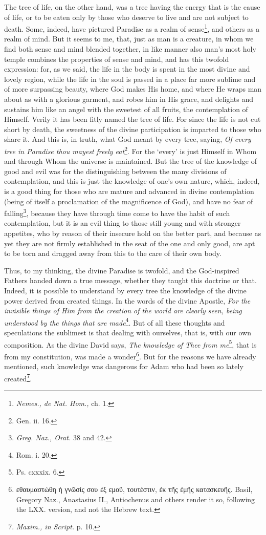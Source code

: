 The tree of life, on the other hand, was a tree having the energy that is the cause of life, or to be eaten only by those who deserve to live and are not subject to death. Some, indeed, have pictured Paradise as a realm of sense\footnote{\emph{Nemes., de Nat. Hom., }ch. 1.}, and others as a realm of mind. But it seems to me, that, just as man is a creature, in whom we find both sense and mind blended together, in like manner also man’s most holy temple combines the properties of sense and mind, and has this twofold expression: for, as we said, the life in the body is spent in the most divine and lovely region, while the life in the soul is passed in a place far more sublime and of more surpassing beauty, where God makes His home, and where He wraps man about as with a glorious garment, and robes him in His grace, and delights and sustains him like an angel with the sweetest of all fruits, the contemplation of Himself. Verily it has been fitly named the tree of life. For since the life is not cut short by death, the sweetness of the divine participation is imparted to those who share it. And this is, in truth, what God meant by every tree, saying, \emph{Of every tree in Paradise thou mayest freely eat}\footnote{Gen. ii. 16.}. For the ‘every’ is just Himself in Whom and through Whom the universe is maintained. But the tree of the knowledge of good and evil was for the distinguishing between the many divisions of contemplation, and this is just the knowledge of one’s own nature, which, indeed, is a good thing for those who are mature and advanced in divine contemplation (being of itself a proclamation of the magnificence of God), and have no fear of falling\footnote{\emph{Greg. Naz., Orat. }38 and 42.}, because they have through time come to have the habit of such contemplation, but it is an evil thing to those still young and with stronger appetites, who by reason of their insecure hold on the better part, and because as yet they are not firmly established in the seat of the one and only good, are apt to be torn and dragged away from this to the care of their own body.

Thus, to my thinking, the divine Paradise is twofold, and the God-inspired Fathers handed down a true message, whether they taught this doctrine or that. Indeed, it is possible to understand by every tree the knowledge of the divine power derived from created things. In the words of the divine Apostle, \emph{For the invisible things of Him from the creation of the world are clearly seen, being understood by the things that are made}\footnote{Rom. i. 20.}. But of all these thoughts and speculations the sublimest is that dealing with ourselves, that is, with our own composition. As the divine David says, \emph{The knowledge of Thee from me}\footnote{Ps. cxxxix. 6.}, that is from my constitution, was made a wonder\footnote{\textgreek{εθαυμαστώθη ἡ γνῶσίς σου ἐξ εμοῦ, τουτέστιν, ἐκ τῆς ἐμῆς κατασκευῆς}. Basil, Gregory Naz., Anastasius II., Antiochenus and others render it so, following the LXX. version, and not the Hebrew text.}. But for the reasons we have already mentioned, such knowledge was dangerous for Adam who had been so lately created\footnote{\emph{Maxim., in Script. }p. 10.}.

